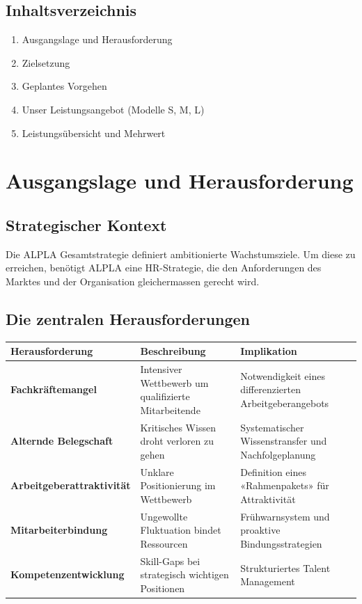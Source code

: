 \documentclass[11pt,a4paper]{article}
\begin{document}
\subsection*{Inhaltsverzeichnis}
\begin{enumerate}[label=\arabic*.]
    \item Ausgangslage und Herausforderung
    \item Zielsetzung
    \item Geplantes Vorgehen
    \item Unser Leistungsangebot (Modelle S, M, L)
    \item Leistungsübersicht und Mehrwert
\end{enumerate}

\newpage

\section{Ausgangslage und Herausforderung}

\subsection{Strategischer Kontext}

Die ALPLA Gesamtstrategie definiert ambitionierte Wachstumsziele. Um diese zu erreichen, benötigt ALPLA eine HR-Strategie, die den Anforderungen des Marktes und der Organisation gleichermassen gerecht wird.

\subsection{Die zentralen Herausforderungen}

\begin{table}[h]
\centering
\begin{tabular}{p{3cm}p{5cm}p{5cm}}
\toprule
\textbf{Herausforderung} & \textbf{Beschreibung} & \textbf{Implikation} \\
\midrule
\textbf{Fachkräftemangel} & Intensiver Wettbewerb um qualifizierte Mitarbeitende & Notwendigkeit eines differenzierten Arbeitgeberangebots \\
\textbf{Alternde Belegschaft} & Kritisches Wissen droht verloren zu gehen & Systematischer Wissenstransfer und Nachfolgeplanung \\
\textbf{Arbeitgeberattraktivität} & Unklare Positionierung im Wettbewerb & Definition eines «Rahmenpakets» für Attraktivität \\
\textbf{Mitarbeiterbindung} & Ungewollte Fluktuation bindet Ressourcen & Frühwarnsystem und proaktive Bindungsstrategien \\
\textbf{Kompetenzentwicklung} & Skill-Gaps bei strategisch wichtigen Positionen & Strukturiertes Talent Management \\
\bottomrule
\end{tabular}
\end{table}
\end{document}

